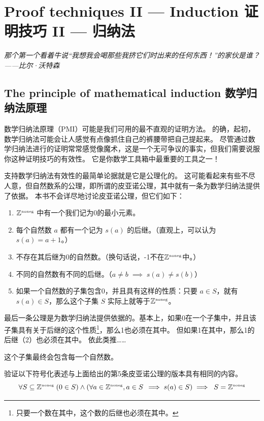 \chapter{Proof techniques II --- Induction 证明技巧 II --- 归纳法}
\label{ch:proof2}

{\em 那个第一个看着牛说“我想我会喝那些我挤它们时出来的任何东西！”的家伙是谁？——比尔·沃特森}

\section{The principle of mathematical induction 数学归纳法原理}
\label{sec:induct}

数学归纳法原理（PMI）可能是我们可用的最不直观的证明方法。
的确，起初，数学归纳法可能会让人感觉有点像抓住自己的裤腰带把自己提起来。
尽管通过数学归纳法进行的证明常常感觉像魔术，这是一个无可争议的事实，但我们需要说服你这种证明技巧的有效性。
它是你数学工具箱中最重要的工具之一！

支持数学归纳法有效性的最简单论据就是它是公理化的。
这可能看起来有些不尽人意，但自然数系的公理，即所谓的皮亚诺公理，其中就有一条为数学归纳法提供了依据。
本书不会详尽地讨论皮亚诺公理，但它们如下：

\begin{enumerate}
\item[i)] 
${\mathbb Z}^{\mbox{\tiny noneg}}$ 中有一个我们记为0的最小元素。
\item[ii)] 
每个自然数 $a$ 都有一个记为 $s(a)$ 的后继。（直观上，可以认为 $s(a) = a+1$。）
\item[iii)]
不存在其后继为0的自然数。（换句话说，-1不在${\mathbb Z}^{\mbox{\tiny noneg}}$中。）
\item[iv)] 
不同的自然数有不同的后继。（$a \neq b \; \implies \; s(a) \neq s(b)$）
\item[v)] 
如果一个自然数的子集包含0，并且具有这样的性质：只要 $a \in S$，就有 $s(a) \in S$，那么这个子集 $S$ 实际上就等于${\mathbb Z}^{\mbox{\tiny noneg}}$。
\end{enumerate}

最后一条公理是为数学归纳法提供依据的。基本上，如果0在一个子集中，并且该子集具有关于后继的这个性质\footnote{只要一个数在其中，这个数的后继也必须在其中。}，那么1也必须在其中。
但如果1在其中，那么1的后继（2）也必须在其中。
依此类推……

这个子集最终会包含每一个自然数。

\begin{exer}
验证以下符号化表述与上面给出的第5条皮亚诺公理的版本具有相同的内容。
\[ \forall S \subseteq {\mathbb Z}^{\mbox{\tiny noneg}} \; ( 0 \in S ) \land (\forall a \in {\mathbb Z}^{\mbox{\tiny noneg}}, a \in S \, \implies s(a) \in S) \implies  \; S={\mathbb Z}^{\mbox{\tiny noneg}} \]

\end{exer}
\bigskip

